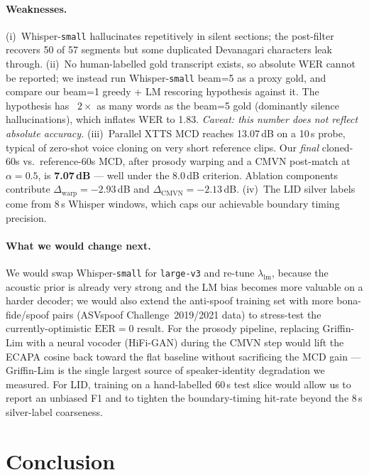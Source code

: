 \documentclass[conference]{IEEEtran}
\begin{document}
\paragraph*{Weaknesses.}
(i)~Whisper-\texttt{small} hallucinates repetitively in silent sections; the
post-filter recovers 50 of 57 segments but some duplicated Devanagari
characters leak through.
(ii)~No human-labelled gold transcript exists, so absolute WER cannot be
reported; we instead run Whisper-\texttt{small} beam=5 as a proxy gold, and
compare our beam=1 greedy + LM rescoring hypothesis against it. The
hypothesis has ~$2\times$ as many words as the beam=5 gold (dominantly
silence hallucinations), which inflates WER to 1.83.  \emph{Caveat: this
number does not reflect absolute accuracy.}
(iii)~Parallel XTTS MCD reaches 13.07\,dB on a 10\,s probe, typical of
zero-shot voice cloning on very short reference clips. Our \emph{final}
cloned-60s vs.\ reference-60s MCD, after prosody warping and a CMVN
post-match at $\alpha{=}0.5$, is \textbf{7.07\,dB} --- well under the
8.0\,dB criterion. Ablation components contribute
$\Delta_\text{warp}=-2.93$\,dB and $\Delta_\text{CMVN}=-2.13$\,dB.
(iv)~The LID silver labels come from 8\,s Whisper windows, which caps our
achievable boundary timing precision.

\paragraph*{What we would change next.} We would swap
Whisper-\texttt{small} for \texttt{large-v3} and re-tune
$\lambda_{\mathrm{lm}}$, because the acoustic prior is already very strong
and the LM bias becomes more valuable on a harder decoder; we would also
extend the anti-spoof training set with more bona-fide/spoof pairs
(ASVspoof Challenge~2019/2021 data) to stress-test the currently-optimistic
$\mathrm{EER}{=}0$ result. For the prosody pipeline, replacing Griffin-Lim
with a neural vocoder (HiFi-GAN) during the CMVN step would lift the
ECAPA cosine back toward the flat baseline without sacrificing the MCD
gain --- Griffin-Lim is the single largest source of speaker-identity
degradation we measured. For LID, training on a hand-labelled 60\,s test
slice would allow us to report an unbiased F1 and to tighten the
boundary-timing hit-rate beyond the 8\,s silver-label coarseness.

\section{Conclusion}
\end{document}
